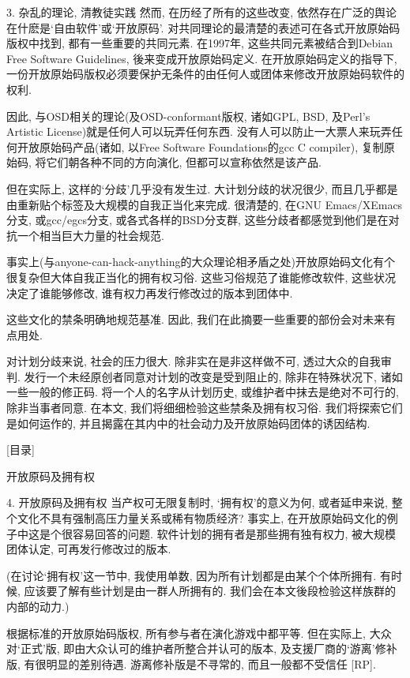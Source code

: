 \documentclass[a4paper,12pt,UTF8,twoside]{ctexbook}
\begin{document}
3. 杂乱的理论, 清教徒实践
然而, 在历经了所有的这些改变, 依然存在广泛的舆论在什麽是`自由软件'或`开放原码'. 对共同理论的最清楚的表述可在各式开放原始码版权中找到, 都有一些重要的共同元素.
在1997年, 这些共同元素被结合到Debian Free Software Guidelines, 後来变成开放原始码定义. 在开放原始码定义的指导下, 一份开放原始码版权必须要保护无条件的由任何人或团体来修改开放原始码软件的权利.

因此, 与OSD相关的理论(及OSD-conformant版权, 诸如GPL, BSD, 及Perl's Artistic License)就是任何人可以玩弄任何东西. 没有人可以防止一大票人来玩弄任何开放原始码产品(诸如, 以Free Software Foundations的gcc C compiler), 复制原始码, 将它们朝各种不同的方向演化, 但都可以宣称依然是该产品.

但在实际上, 这样的`分歧'几乎没有发生过. 大计划分歧的状况很少, 而且几乎都是由重新贴个标签及大规模的自我正当化来完成. 很清楚的, 在GNU Emacs/XEmacs分支, 或gcc/egcs分支, 或各式各样的BSD分支群, 这些分歧者都感觉到他们是在对抗一个相当巨大力量的社会规范.

事实上(与anyone-can-hack-anything的大众理论相矛盾之处)开放原始码文化有个很复杂但大体自我正当化的拥有权习俗. 这些习俗规范了谁能修改软件, 这些状况决定了谁能够修改,  谁有权力再发行修改过的版本到团体中.

这些文化的禁条明确地规范基准. 因此, 我们在此摘要一些重要的部份会对未来有点用处.

对计划分歧来说, 社会的压力很大. 除非实在是非这样做不可, 透过大众的自我审判.
发行一个未经原创者同意对计划的改变是受到阻止的, 除非在特殊状况下, 诸如一些一般的修正码.
将一个人的名字从计划历史, 或维护者中抹去是绝对不可行的, 除非当事者同意.
在本文, 我们将细细检验这些禁条及拥有权习俗. 我们将探索它们是如何运作的, 并且揭露在其内中的社会动力及开放原始码团体的诱因结构.

[目录]

开放原码及拥有权

4. 开放原码及拥有权
当产权可无限复制时, `拥有权'的意义为何, 或者延申来说, 整个文化不具有强制高压力量关系或稀有物质经济?
事实上, 在开放原始码文化的例子中这是个很容易回答的问题. 软件计划的拥有者是那些拥有独有权力, 被大规模团体认定, 可再发行修改过的版本.

(在讨论`拥有权'这一节中, 我使用单数, 因为所有计划都是由某个个体所拥有. 有时候, 应该要了解有些计划是由一群人所拥有的. 我们会在本文後段检验这样族群的内部的动力.)

根据标准的开放原始码版权, 所有参与者在演化游戏中都平等. 但在实际上, 大众对`正式'版, 即由大众认可的维护者所整合并认可的版本, 及支援厂商的`游离'修补版, 有很明显的差别待遇. 游离修补版是不寻常的, 而且一般都不受信任 [RP].
\end{document}
